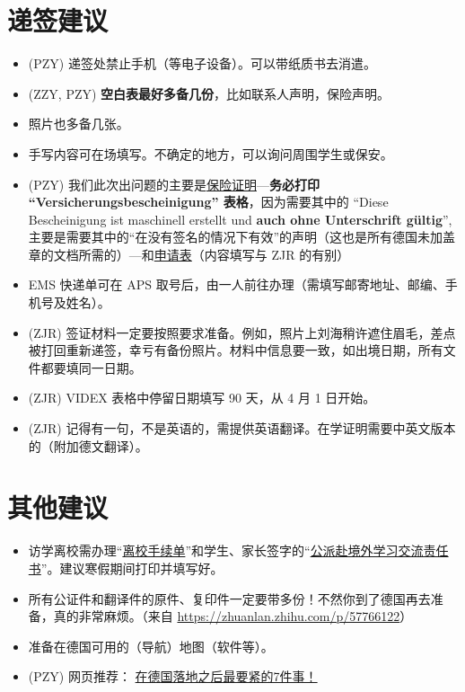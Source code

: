 \documentclass[oneside,final]{book}
\begin{document}
\section{递签建议}
\begin{itemize}
\item (PZY) 递签处禁止手机（等电子设备）。可以带纸质书去消遣。
\item (ZZY, PZY) \textbf{\color{blue}空白表最好多备几份}，比如联系人声明，保险声明。
\item\label{print-fee} 照片也多备几张。
\item 手写内容可在场填写。不确定的地方，可以询问周围学生或保安。
\item\label{ensurance-Versicherungsbescheinigung} (PZY) 我们此次出问题的主要是\underline{保险证明}---\textbf{\color{red}务必打印 ``Versicherungsbescheinigung'' 表格}，因为需要其中的 ``Diese Bescheinigung ist maschinell erstellt und \textbf{\color{red}auch ohne Unterschrift gültig}'', 主要是需要其中的“在没有签名的情况下有效”的声明（这也是所有德国未加盖章的文档所需的）---和\underline{申请表}（内容填写与 ZJR 的有别）%
\item EMS 快递单可在 APS 取号后，由一人前往办理（需填写邮寄地址、邮编、手机号及姓名）。
\item (ZJR) 签证材料一定要按照要求准备。例如，照片上刘海稍许遮住眉毛，差点被打回重新递签，幸亏有备份照片。材料中信息要一致，如出境日期，所有文件都要填同一日期。
\item (ZJR) VIDEX 表格中停留日期填写 90 天，从 4 月 1 日开始。
\item (ZJR) 记得有一句，不是英语的，需提供英语翻译。在学证明需要中英文版本的（附加德文翻译）。
\end{itemize}
%

\section{其他建议}
\begin{itemize}
  \item 访学离校需办理“\href{http://bkjy.ucas.ac.cn/index.php/fxjl/download/3401-2017-06-13-03-47-14?task=down&fid=818}{离校手续单}”和学生、家长签字的“\href{http://bkjy.ucas.ac.cn/index.php/fxjl/download/3400-2017-06-13-03-46-26?task=down&fid=701}{公派赴境外学习交流责任书}”。建议寒假期间打印并填写好。
  \item 所有公证件和翻译件的原件、复印件一定要带多份！不然你到了德国再去准备，真的非常麻烦。（来自 \url{https://zhuanlan.zhihu.com/p/57766122}）
  \item 准备在德国可用的（导航）地图（软件等）。
  \item (PZY) 网页推荐： \href{https://mp.weixin.qq.com/s?srcid=0319fCMV7x6jt2w4xgPGYSMm&scene=23&mid=2651269086&sn=2b9eff5e72b2e989ac404be9be21bc09&idx=2&__biz=MzA4NTM2MzAxNw%3D%3D&chksm=842a97f8b35d1eee47778e42c10d883071d1546d6bab41132685fd4c983a6d713ca70a9b2328&mpshare=1#rd&appinstall=0}{在德国落地之后最要紧的7件事！}
\end{itemize}
\end{document}

